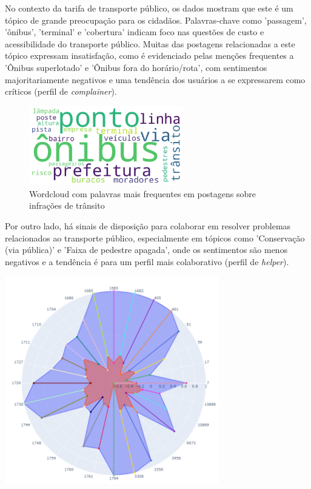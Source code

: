 No contexto da tarifa de transporte público, os dados mostram que este é um tópico de grande preocupação para os cidadãos. Palavras-chave como 'passagem', 'ônibus', 'terminal' e 'cobertura' indicam foco nas questões de custo e acessibilidade do transporte público. Muitas das postagens relacionadas a este tópico expressam insatisfação, como é evidenciado pelas menções frequentes a 'Ônibus superlotado' e 'Ônibus fora do horário/rota', com sentimentos majoritariamente negativos e uma tendência dos usuários a se expressarem como críticos (perfil de \textit{complainer}).

\begin{figure}[htb]
	\centering
	\includegraphics[width=0.6\textwidth]{images/wordcloud_busfare.png}
	\caption{Wordcloud com palavras mais frequentes em postagens sobre infrações de trânsito}
	\label{fig:wordcloud_busfare}
\end{figure}

Por outro lado, há sinais de disposição para colaborar em resolver problemas relacionados ao transporte público, especialmente em tópicos como 'Conservação (via pública)' e 'Faixa de pedestre apagada', onde os sentimentos são menos negativos e a tendência é para um perfil mais colaborativo (perfil de \textit{helper}).

\begin{quadro}[htb]
	\centering
	\includegraphics[width=0.7\textwidth]{images/social_barometer_bus_fare.png}
	\caption{Gráfico de Radar ilustrando a pressão social em relação ao tópico de Tarifa de Transporte Público}
	\label{fig:social_barometer_bus_fare}
\end{quadro}

